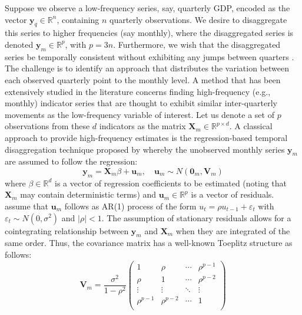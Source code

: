 Suppose we observe a low-frequency series, say, quarterly GDP, encoded as the vector \(\mathbf{y}_q\in \mathbb{R}^n\), containing \(n\) quarterly observations. We desire to disaggregate this series to higher frequencies (say monthly), where the disaggregated series is denoted \(\mathbf{y}_m\in \mathbb{R}^p\), with \(p=3n\). Furthermore, we wish that the disaggregated series be temporally consistent without exhibiting any jumps between quarters \citep[see Section 3.4 of][ for examples of such inconsistencies between the periods]{dagum2006benchmarking}. The challenge is to identify an approach that distributes the variation between each observed quarterly point to the monthly level. A method that has been extensively studied in the literature concerns finding high-frequency (e.g., monthly) indicator series that are thought to exhibit similar inter-quarterly movements as the low-frequency variable of interest. Let us denote a set of \(p\) observations from these \(d\) indicators as the matrix \(\mathbf{X}_m\in \mathbb{R}^{p\times d}\). A classical approach to provide high-frequency estimates is the regression-based temporal disaggregation technique proposed by \citet{chow1971best} whereby the unobserved monthly series \(\mathbf{y}_m\) are assumed to follow the regression:
\begin{equation}
\mathbf{y}_m=\mathbf{X}_m\beta+\mathbf{u}_m,\quad \mathbf{u}_m\sim N(\mathbf{0}_m,\mathbf{V}_m)
\label{eq:ChowLin}
\end{equation}
where \(\beta \in\mathbb{R}^d\) is a vector of regression coefficients to be estimated (noting that \(\mathbf{X}_m\) may contain deterministic terms) and \(\mathbf{u}_m\in \mathbb{R}^p\) is a vector of residuals. \citet{chow1971best} assume that \(\mathbf{u}_m\) follows as AR(1) process of the form \(u_t=\rho u_{t-1}+\varepsilon_t\) with \(\varepsilon_t\sim N(0,\sigma^2)\) and \(\lvert \rho\rvert <1\). The assumption of stationary residuals allows for a cointegrating relationship between \(\mathbf{y}_m\) and \(\mathbf{X}_m\) when they are integrated of the same order.
Thus, the covariance matrix has a well-known Toeplitz structure as follows:
\begin{equation}
\mathbf{V}_m=\frac{\sigma^2}{1-\rho^2}
\begin{pmatrix}
1 & \rho &\cdots & \rho^{p-1}\\
\rho & 1 &\cdots & \rho^{p-2}\\
\vdots&\vdots&\ddots&\vdots \\
\rho^{p-1} & \rho^{p-2} &\cdots & 1\\
\end{pmatrix}
\end{equation}
